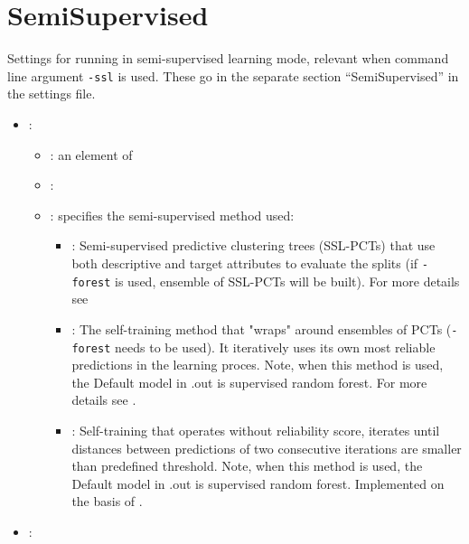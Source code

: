 \section{SemiSupervised}

Settings for running \clus{} in semi-supervised learning mode, relevant when command line argument {\tt -ssl} is used. These go in the separate section ``SemiSupervised'' in the settings file.


\begin{itemize}
    \item {}:
           \begin{itemize}
                \item \optionPossibleValues{}: an element of 
                \item \optionDefaultValue{}: 
                \item \optionDescrption{}: specifies the semi-supervised method used:
                \begin{itemize}
                    \item {}: Semi-supervised predictive clustering trees (SSL-PCTs) that use both descriptive and target attributes to evaluate the splits (if {\tt -forest} is used, ensemble of SSL-PCTs will be built). For more details see \cite{levatic2017_SSL4MTR_distanceBased,levatic2017_SSL4class_distanceBased}
                    \item {}: The self-training method that "wraps" around ensembles of PCTs ({\tt -forest} needs to be used). It iteratively uses its own most reliable predictions in the learning proces. Note, when this method is used, the Default model in .out is supervised random forest. For more details see \cite{levatic2017_self-training}.  
                    \item {}: Self-training that operates without reliability score, iterates until distances between predictions of two consecutive iterations are smaller than predefined threshold. Note, when this method is used, the Default model in .out is supervised random forest. Implemented on the basis of \cite{culp_iterative_2008}.
                \end{itemize}
           \end{itemize}
    \item {}:
           \begin{itemize}

\end{itemize}
\end{itemize}

